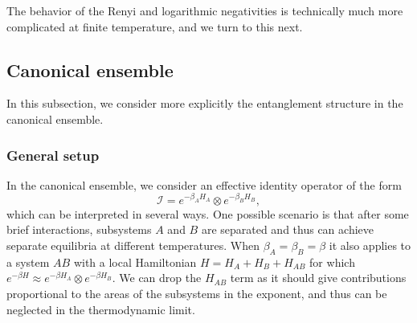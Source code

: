 \documentclass[a4paper,11pt]{article}
\newcommand\half{{\ensuremath{\frac{1}{2}}}}
\newcommand{\be}{\begin{equation}}
\newcommand{\ee}{\end{equation}}
\newcommand{\bca}{\begin{cases}}
\newcommand{\eca}{\end{cases}}
\def\b{{\beta}}
\newcommand\lam{\lambda}
\newcommand\ov{\over}
\newcommand\ha{{\half}}
\def\le{\left}
\def\ri{\right}
\newcommand\sI{{\ensuremath{{\mathcal I}}}}
\begin{document}
The behavior of the Renyi and logarithmic negativities is technically much more complicated at finite temperature, and we turn to this next. 

\iffalse
\be 
I_n (A_1, A_2) = \bca S_{n, A_1}^{( {\rm eq})} + S_{n, A_2}^{( {\rm eq})} - S_{n, A}^{( {\rm eq})} & S_{n, A}^{( {\rm eq})} < 
 S_{n, B}^{( {\rm eq})} \cr
S_{n, A_1}^{( {\rm eq})} + S_{n, A_2}^{( {\rm eq})} - S_{n, B}^{( {\rm eq})} & c_n>\ha,\; 1-\frac{1}{2c_n}< \lambda_n< \frac{1}{2c_n} \cr
2 S_n^{(A_2, {\rm eq})} & S_{n, A_1}^{( {\rm eq})} > S_{n, A_2B}^{( {\rm eq})} \ \cr
2 S_n^{(A_1, {\rm eq})} & \lam_n < 1- {1 \ov 2 c_n} 
\eca \ .
\ee
\fi


\iffalse
\be \label{ehwn}
S_{n, A_1}= {\rm min} \le(S_{n, A_1}^{({\rm eq})} , S_{n, A_2B}^{({\rm eq})}\ri) , %
\quad S_{n, A_2} = {\rm min} \le(S_{n, A_2}^{({\rm eq})} , S_{n, A_1B}^{({\rm eq})}\ri), 
 \quad S_{n, A} = {\rm min} \le(S_{n, A}^{({\rm eq})} , S_{n, B}^{({\rm eq})} \ri) \ .
\ee
\fi





\subsection{Canonical ensemble} 


In this subsection, we consider more explicitly the entanglement structure in the canonical ensemble. 


\subsubsection{General setup} \label{general_canonical}

In the canonical ensemble, we consider an effective identity operator of the form 
\be \label{canD} 
\sI = e^{-\b_A H_A} \otimes e^{-\b_B H_B} ,
\ee
which can be interpreted in several ways. One possible scenario is that after some brief interactions, subsystems $A$ and $B$ are separated and thus can achieve separate equilibria at different temperatures. When $\b_A = \b_B = \b$ it also applies to a system $AB$ with a local Hamiltonian $H = H_A + H_B + H_{AB}$ for which $e^{-\beta H} \approx e^{-\beta H_{A}} \otimes e^{-\beta H_{B}} $. We can drop the $H_{AB}$ term as it should give contributions proportional to the areas of the subsystems in the exponent, and thus can be neglected in the thermodynamic limit. 
\end{document}
